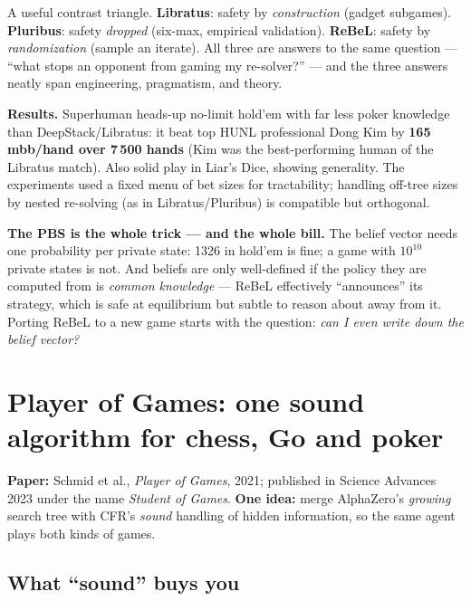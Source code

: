 \documentclass[11pt,a4paper]{article}
\begin{document}
\begin{intuition}
A useful contrast triangle. \textbf{Libratus}: safety by \emph{construction}
(gadget subgames). \textbf{Pluribus}: safety \emph{dropped} (six-max,
empirical validation). \textbf{ReBeL}: safety by \emph{randomization}
(sample an iterate). All three are answers to the same question --- ``what
stops an opponent from gaming my re-solver?'' --- and the three answers
neatly span engineering, pragmatism, and theory.
\end{intuition}

\textbf{Results.} Superhuman heads-up no-limit hold'em with far less poker
knowledge than DeepStack/Libratus: it beat top HUNL professional Dong Kim by
\textbf{165\,mbb/hand over 7\,500 hands} (Kim was the best-performing human of
the Libratus match). Also solid play in Liar's Dice, showing generality. The
experiments used a fixed menu of bet sizes for tractability; handling
off-tree sizes by nested re-solving (as in Libratus/Pluribus) is compatible
but orthogonal.

\begin{trap}
\textbf{The PBS is the whole trick --- and the whole bill.} The belief vector
needs one probability per private state: 1326 in hold'em is fine; a game with
$10^{10}$ private states is not. And beliefs are only well-defined if the
policy they are computed from is \emph{common knowledge} --- ReBeL effectively
``announces'' its strategy, which is safe at equilibrium but subtle to reason
about away from it. Porting ReBeL to a new game starts with the question:
\emph{can I even write down the belief vector?}
\end{trap}

\section{Player of Games: one sound algorithm for chess, Go and poker}

\textbf{Paper:} Schmid et al., \emph{Player of Games}, 2021; published in
Science Advances 2023 under the name \emph{Student of Games}. \quad
\textbf{One idea:} merge AlphaZero's \emph{growing} search tree with CFR's
\emph{sound} handling of hidden information, so the same agent plays both
kinds of games.

\subsection{What ``sound'' buys you}
\end{document}
